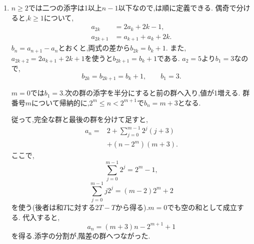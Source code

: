 \noindent {}\par\nobreak
\begin{enumerate}[label=(\arabic*),parsep=3pt,beginpenalty=10000,format=\bookitemlink{example-gauss-role-7}{solution}{problem}]
  \item $n\ge2$では二つの添字は1以上$n-1$以下なので,は順に定義できる.
    偶奇で分けると,$k\ge1$について,
    \[
      \begin{aligned}
        a_{2k}&=2a_k+2k-1,\\
        a_{2k+1}&=a_{k+1}+a_k+2k.
      \end{aligned}
    \]
    $b_n=a_{n+1}-a_n$とおくと,両式の差から$b_{2k}=b_k+1$.
    また,$a_{2k+2}=2a_{k+1}+2k+1$を使うと$b_{2k+1}=b_k+1$である.
    $a_2=5$より$b_1=3$なので,
    \[
      b_{2k}=b_{2k+1}=b_k+1,\qquad b_1=3.
    \]

    $m=0$では$b_1=3$.次の群の添字を半分にすると前の群へ入り,値が1増える.
    群番号$m$について帰納的に,$2^m\le n<2^{m+1}$で$b_n=m+3$となる.

    従って,完全な群と最後の群を分けて足すと,
    \begin{align*}
      a_n={}&2+\sum_{j=0}^{m-1}2^j(j+3)\\
      &+(n-2^m)(m+3).
    \end{align*}
    ここで,
    \[
      \sum_{j=0}^{m-1}2^j=2^m-1,
    \]
    \[
      \sum_{j=0}^{m-1}j2^j=(m-2)2^m+2
    \]
    を使う(後者は和$T$に対する$2T-T$から得る).$m=0$でも空の和として成立する.
    代入すると,
    \[
      a_n=(m+3)n-2^{m+1}+1
    \]
    を得る.添字の分割が,階差の群へつながった.
\end{enumerate}
